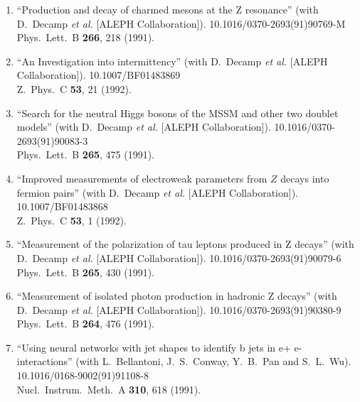\begin{enumerate}
\item ``Production and decay of charmed mesons at the Z resonance'' (with D.~Decamp {\it et al.}  [ALEPH Collaboration]). 10.1016/0370-2693(91)90769-M
\\{}Phys.\ Lett.\ B {\bf 266}, 218 (1991). %


\item ``An Investigation into intermittency'' (with D.~Decamp {\it et al.}  [ALEPH Collaboration]). 10.1007/BF01483869
\\{}Z.\ Phys.\ C {\bf 53}, 21 (1992). %


\item ``Search for the neutral Higgs bosons of the MSSM and other two doublet models'' (with D.~Decamp {\it et al.}  [ALEPH Collaboration]). 10.1016/0370-2693(91)90083-3
\\{}Phys.\ Lett.\ B {\bf 265}, 475 (1991). %


\item ``Improved measurements of electroweak parameters from $Z$ decays into fermion pairs'' (with D.~Decamp {\it et al.}  [ALEPH Collaboration]). 10.1007/BF01483868
\\{}Z.\ Phys.\ C {\bf 53}, 1 (1992). %


\item ``Measurement of the polarization of tau leptons produced in Z decays'' (with D.~Decamp {\it et al.}  [ALEPH Collaboration]). 10.1016/0370-2693(91)90079-6
\\{}Phys.\ Lett.\ B {\bf 265}, 430 (1991). %


\item ``Measurement of isolated photon production in hadronic Z decays'' (with D.~Decamp {\it et al.}  [ALEPH Collaboration]). 10.1016/0370-2693(91)90380-9
\\{}Phys.\ Lett.\ B {\bf 264}, 476 (1991). %


\item ``Using neural networks with jet shapes to identify b jets in e+ e- interactions'' (with L.~Bellantoni, J.~S.~Conway, Y.~B.~Pan and S.~L.~Wu). 10.1016/0168-9002(91)91108-8
\\{}Nucl.\ Instrum.\ Meth.\ A {\bf 310}, 618 (1991). %



\end{enumerate}
